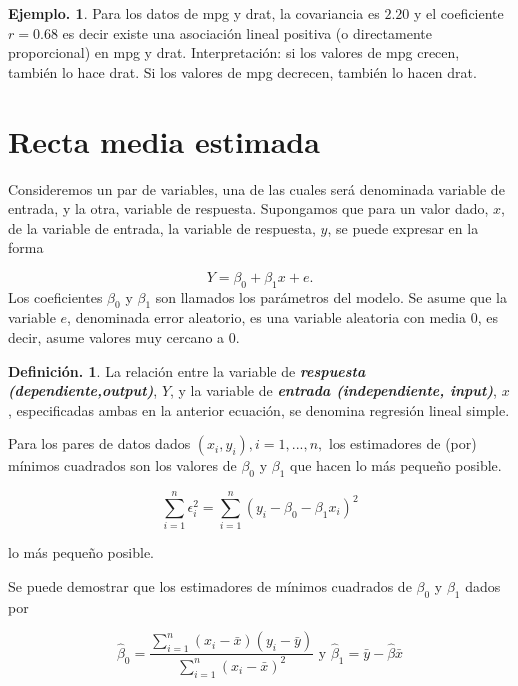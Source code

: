 \documentclass[]{book}
\theoremstyle{definition}
\newtheorem{definition}{Definición.}[chapter]
\theoremstyle{definition}
\newtheorem{example}{Ejemplo.}[chapter]
\theoremstyle{definition}
\theoremstyle{remark}
\begin{document}
\begin{example}
\protect\hypertarget{exm:unnamed-chunk-107}{}{\label{exm:unnamed-chunk-107} }
Para los datos de mpg y drat, la covariancia es
\(2.20\) y el
coeficiente \(r=0.68\) es decir existe una
asociación lineal
positiva (o directamente proporcional) en mpg y
drat.
Interpretación: si los valores de mpg crecen,
también lo hace
drat. Si los valores de mpg decrecen, también lo
hacen drat.
\end{example}

\hypertarget{recta-media-estimada}{%
\section{Recta media estimada}\label{recta-media-estimada}}

Consideremos un par de variables, una de las
cuales será denominada variable de entrada, y la
otra, variable de respuesta.
Supongamos que para un valor dado, \(x\), de la
variable de
entrada, la variable de respuesta, \(y\), se puede
expresar en la forma

\[ Y = \beta_0 + \beta_1 x + e.\]
Los coeficientes \(\beta_0\) y \(\beta_1\) son
llamados los
parámetros del modelo. Se asume que la variable
\(e\), denominada
error aleatorio, es una variable aleatoria con
media \(0\), es
decir, asume valores muy cercano a \(0\).

\begin{definition}
\protect\hypertarget{def:unnamed-chunk-108}{}{\label{def:unnamed-chunk-108} }La relación entre la variable de \textbf{\emph{respuesta
(dependiente,output)}}, \(Y\), y la variable de
\textbf{\emph{entrada
(independiente, input)}}, \(x\), especificadas
ambas en la anterior
ecuación, se denomina regresión lineal simple.
\end{definition}

Para los pares de datos dados \((x_i, y_i), i = 1, . . . , n,\) los
estimadores de (por) mínimos cuadrados son los
valores de
\(\beta_0\) y \(\beta_1\) que hacen lo más pequeño
posible.

\[ \sum_{i=1}^{n}
\epsilon_{i}^{2}=\sum_{i=1}^{n}\left(y_{i}-
\beta_0-\beta_1
x_{i}\right)^{2} \]

lo más pequeño posible.

Se puede demostrar que los estimadores de mínimos
cuadrados de
\(\beta_0\) y \(\beta_1\) dados por

\[
\hat{\beta}_0=\frac{\sum_{i=1}^{n}\left(x_{i}-
\bar{x}\right)\left(y_
{i}-\bar{y}\right)}{\sum_{i=1}^{n}\left(x_{i}-
\bar{x}\right)^{2}}
\text{ y } 
\hat{\beta}_1=\bar{y}-\hat{\beta} \bar{x}
\]
\end{document}
